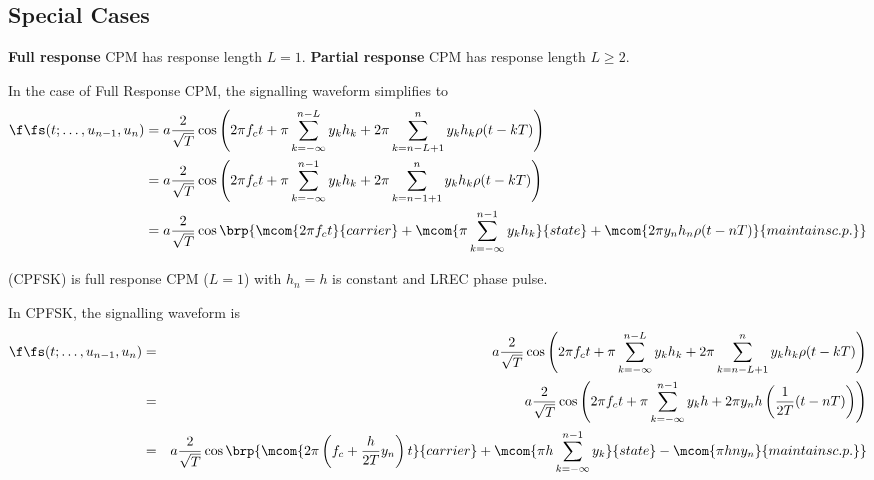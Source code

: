 \subsection{Special Cases}
\begin{definition}
{\bf Full response} CPM has response length $L=1$.
{\bf Partial response} CPM has response length $L\ge2$.
\end{definition}

In the case of Full Response CPM, the signalling waveform simplifies to
\begin{align*}
   \f\fs(t;\ldots,u_{n-1},u_n)
     &= a \frac{2}{\sqrt{T}} 
          \cos\left(
             2\pi f_ct + 
             \pi \sum_{k=-\infty}^{n-L} y_k h_k  + 
             2\pi \sum_{k=n-L+1}^n y_k h_k \rho(t-kT)
          \right)
   \\&= a \frac{2}{\sqrt{T}} 
          \cos\left(
             2\pi f_ct + 
             \pi \sum_{k=-\infty}^{n-1} y_k h_k  + 
             2\pi \sum_{k=n-1+1}^n y_k h_k \rho(t-kT)
          \right)
   \\&= a \frac{2}{\sqrt{T}} 
          \cos\brp{
             \mcom{2\pi f_ct}{carrier} +
             \mcom{\pi \sum_{k=-\infty}^{n-1} y_k h_k}{state}  +
             \mcom{2\pi y_n h_n \rho(t-nT)}{maintains c.p.}
             }
\end{align*}

\begin{definition}
 (CPFSK)
is full response CPM ($L=1$) with $h_n=h$ is constant
and LREC phase pulse.
\end{definition}

In CPFSK, the signalling waveform is
\begin{align*}
   \f\fs(t;\ldots,u_{n-1},u_n)
     &=& a \frac{2}{\sqrt{T}} 
           \cos\left(
              2\pi f_ct + 
              \pi \sum_{k=-\infty}^{n-L} y_k h_k  + 
              2\pi \sum_{k=n-L+1}^n y_k h_k \rho(t-kT)
           \right)
   \\&=& a \frac{2}{\sqrt{T}} 
           \cos\left(
              2\pi f_ct + 
              \pi \sum_{k=-\infty}^{n-1} y_k h  + 
              2\pi y_n h 
              \left( \frac{1}{2T}(t-nT)  \right)
           \right)
   \\&=& a \frac{2}{\sqrt{T}} 
           \cos\brp{
             \mcom{2\pi \left(f_c +  \frac{h}{2T}y_n \right)t}{carrier} +
             \mcom{\pi h\sum_{k=-\infty}^{n-1} y_k }{state}  -
             \mcom{\pi hn y_n }{maintains c.p.}
             }
\end{align*}

